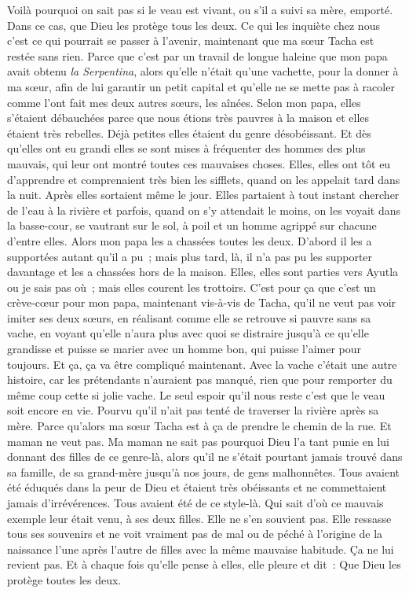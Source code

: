 \pend
%
\pstart
	Voilà pourquoi on sait pas si le veau est vivant, ou s’il a suivi sa mère, emporté. Dans ce cas, que Dieu les protège tous les deux.
\pend
%
\pstart
	Ce qui les inquiète chez nous c’est ce qui pourrait se passer à l’avenir, maintenant que ma sœur Tacha est restée sans rien. Parce que c’est par un travail de longue haleine que mon papa avait obtenu \textit{la Serpentina}, alors qu’elle n’était qu’une vachette, pour la donner à ma sœur, afin de lui garantir un petit capital et qu’elle ne se mette pas à racoler comme l’ont fait mes deux autres sœurs, les aînées.
\pend
%
\pstart
	Selon mon papa, elles s’étaient débauchées parce que nous étions très pauvres à la maison et elles étaient très rebelles. Déjà petites elles étaient du genre désobéissant. Et dès qu’elles ont eu grandi elles se sont mises à fréquenter des hommes des plus mauvais, qui leur ont montré toutes ces mauvaises choses. Elles, elles ont tôt eu d’apprendre et comprenaient très bien les sifflets, quand on les appelait tard dans la nuit. Après elles sortaient même le jour. Elles partaient à tout instant chercher de l’eau à la rivière et parfois, quand on s’y attendait le moins, on les voyait dans la basse-cour, se vautrant sur le sol, à poil et un homme agrippé sur chacune d’entre elles.
\pend
%
\pstart
	Alors mon papa les a chassées toutes les deux. D’abord il les a supportées autant qu’il a pu ; mais plus tard, là, il n’a pas pu les supporter davantage et les a chassées hors de la maison. Elles, elles sont parties vers Ayutla ou je sais pas où ; mais elles courent les trottoirs.
\pend
%
\pstart
	C’est pour ça que c’est un crève-cœur pour mon papa, maintenant vis-à-vis de Tacha, qu’il ne veut pas voir imiter ses deux sœurs, en réalisant comme elle se retrouve si pauvre sans sa vache, en voyant qu’elle n’aura plus avec quoi se distraire jusqu’à ce qu’elle grandisse et puisse se marier avec un homme bon, qui puisse l’aimer pour toujours. Et ça, ça va être compliqué maintenant. Avec la vache c’était une autre histoire, car les prétendants n’auraient pas manqué, rien que pour remporter du même coup cette si jolie vache.
\pend
%
\pstart
	Le seul espoir qu’il nous reste c’est que le veau soit encore en vie. Pourvu qu’il n’ait pas tenté de traverser la rivière après sa mère. Parce qu’alors ma sœur Tacha est à ça de prendre le chemin de la rue. Et maman ne veut pas.
\pend
%
\pstart
	Ma maman ne sait pas pourquoi Dieu l’a tant punie en lui donnant des filles de ce genre-là, alors qu’il ne s’était pourtant jamais trouvé dans sa famille, de sa grand-mère jusqu’à nos jours, de gens malhonnêtes. Tous avaient été éduqués dans la peur de Dieu et étaient très obéissants et ne commettaient jamais d’irrévérences. Tous avaient été de ce style-là. Qui sait d’où ce mauvais exemple leur était venu, à ses deux filles. Elle ne s’en souvient pas. Elle ressasse tous ses souvenirs et ne voit vraiment pas de mal ou de péché à l’origine de la naissance l’une après l’autre de filles avec la même mauvaise habitude. Ça ne lui revient pas. Et à chaque fois qu’elle pense à elles, elle pleure et dit : \og{}Que Dieu les protège toutes les deux.\fg
